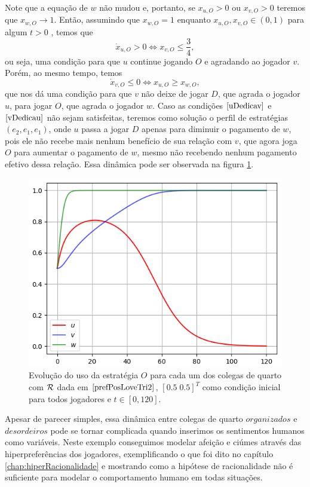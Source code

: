 Note que a equação de $w$ não mudou e, portanto, se $x_{u,O}>0$ ou $x_{v,O}>0$ teremos que $x_{w,O}\to 1$. Então, assumindo que $x_{w,O}=1$ enquanto $x_{u,O},x_{v,O}\in(0,1)$ para algum $t>0$ , temos que
\begin{equation}
    \label{uDedicav}
    \dot{x}_{u,O}>0 \Longleftrightarrow x_{v,O} \leq \frac{3}{4},
\end{equation}
ou seja, uma condição para que $u$ continue jogando $O$ e agradando ao jogador $v$. Porém, ao mesmo tempo, temos
\begin{equation}
    \label{vDedicau}
    \dot{x}_{v,O} \leq 0 \Longleftrightarrow x_{u,O} \geq x_{w,O},
\end{equation}
que nos dá uma condição para que $v$ não deixe de jogar $D$, que agrada o jogador $u$, para jogar $O$, que agrada o jogador $w$. Caso as condições $\eqref{uDedicav}$ e $\eqref{vDedicau}$ não sejam satisfeitas, teremos como solução o perfil de estratégias $(e_2,e_1,e_1)$, onde $u$ passa a jogar $D$ apenas para diminuir o pagamento de $w$, pois ele não recebe mais nenhum benefício de sua relação com $v$, que agora joga $O$ para aumentar o pagamento de $w$, mesmo não recebendo nenhum pagamento efetivo dessa relação. Essa dinâmica pode ser observada na figura \ref{fig:love_tri2.png}.

\begin{figure}[h]
    \caption{Evolução do uso da estratégia $O$ para cada um dos colegas de quarto com $\mathcal{R}$ dada em $\eqref{prefPosLoveTri2}$,  $[0.5 \; 0.5]^T$ como condição inicial para todos jogadores e $t\in[0,120]$.}
    \centerline{\includegraphics[scale=0.8]{./img/love_tri2.png}}
    \label{fig:love_tri2.png}
\end{figure}

Apesar de parecer simples, essa dinâmica entre colegas de quarto $\textit{organizados}$ e $\textit{desordeiros}$ pode se tornar complicada quando inserimos os sentimentos humanos como variáveis. Neste exemplo conseguimos modelar afeição e ciúmes através das hiperpreferências dos jogadores, exemplificando o que foi dito no capítulo \ref{chap:hiperRacionalidade} e mostrando como a hipótese de racionalidade não é suficiente para modelar o comportamento humano em todas situações.